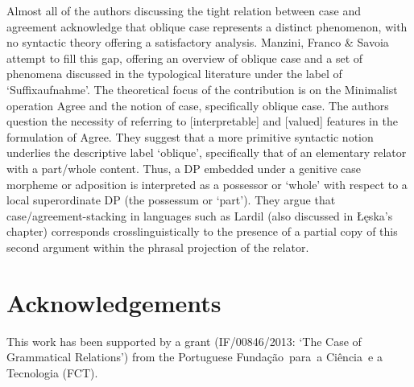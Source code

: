 \documentclass[output=paper]{langsci/langscibook}
\begin{document}
Almost all of the authors discussing the tight relation between case and agreement acknowledge that oblique case represents a distinct phenomenon, with no syntactic theory offering a satisfactory analysis. Manzini, Franco \& Savoia attempt to fill this gap, offering an overview of oblique case and a set of phenomena discussed in the typological literature under the label of ‘Suffixaufnahme’. The theoretical focus of the contribution is on the Minimalist operation Agree and the notion of case, specifically oblique case. The authors question the necessity of referring to [interpretable] and [valued] features in the formulation of Agree. They suggest that a more primitive syntactic notion underlies the descriptive label ‘oblique’, specifically that of an elementary relator with a part/whole content. Thus, a DP embedded under a genitive case morpheme or adposition is interpreted as a possessor or ‘whole’ with respect to a local superordinate DP (the possessum or ‘part’). They argue that case/agreement-stacking in languages such as Lardil (also discussed in Łęska’s chapter) corresponds crosslinguistically to the presence of a partial copy of this second argument within the phrasal projection of the relator.

\section*{Acknowledgements}
This work has been supported by a grant (IF/00846/2013: ‘The Case of Grammatical Relations’) from the Portuguese Fundação~para~a Ciência~e a Tecnologia (FCT).

\sloppy
\printbibliography[heading=subbibliography,notkeyword=this] 
\end{document}
